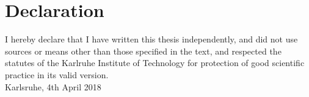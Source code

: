 \documentclass[12pt,a4paper]{scrartcl}
\theoremstyle{plain}
\theoremstyle{definition}
\numberwithin{equation}{section}
\theoremstyle{case}
\begin{document}
  \thispagestyle{empty}


  \vspace*{8cm}


  \section*{Declaration}

I hereby declare that I have written this thesis independently, and did not use sources or means other than those specified in the text,
 and respected the statutes of the Karlruhe Institute of Technology for protection of good scientific practice in its valid version.
\\[2ex] 





  \noindent
Karlsruhe, 4th April 2018\\[5ex]

\end{document}
